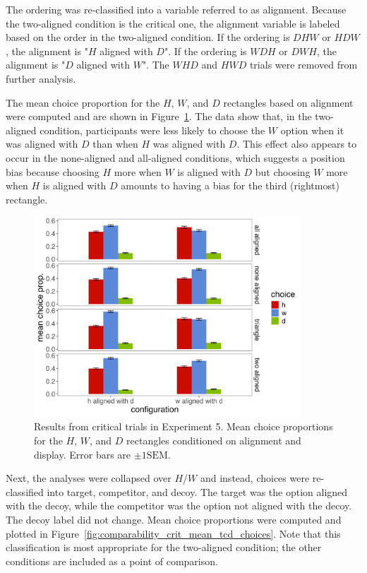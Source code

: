The ordering was re-classified into a variable referred to as alignment. Because the two-aligned condition is the critical one, the alignment variable is labeled based on the order in the two-aligned condition. If the ordering is $DHW$ or $HDW$, the alignment is "$H$ aligned with $D$". If the ordering is $WDH$ or $DWH$, the alignment is "$D$ aligned with $W$". The $WHD$ and $HWD$ trials were removed from further analysis.

The mean choice proportion for the $H$, $W$, and $D$ rectangles based on alignment were computed and are shown in Figure~\ref{fig:comparability_crit_mean_choices}. The data show that, in the two-aligned condition, participants were less likely to choose the $W$ option when it was aligned with $D$ than when $H$ was aligned with $D$. This effect also appears to occur in the none-aligned and all-aligned conditions, which suggests a position bias because choosing $H$ more when $W$ is aligned with $D$ but choosing $W$ more when $H$ is aligned with $D$ amounts to having a bias for the third (rightmost) rectangle.

\begin{figure}
   \centering
   \includegraphics[width=100mm]{figures/comparability_crit_mean_hdw_choice_by_config_align.jpeg}
   \caption{Results from critical trials in Experiment 5. Mean choice proportions for the $H$, $W$, and $D$ rectangles conditioned on alignment and display. Error bars are $\pm1\mathrm{SEM}$.}
   \label{fig:comparability_crit_mean_choices}
\end{figure}

Next, the analyses were collapsed over $H$/$W$ and instead, choices were re-classified into target, competitor, and decoy. The target was the option aligned with the decoy, while the competitor was the option not aligned with the decoy. The decoy label did not change. Mean choice proportions were computed and plotted in Figure~\ref{fig:comparability_crit_mean_tcd_choices}. Note that this classification is most appropriate for the two-aligned condition; the other conditions are included as a point of comparison.

